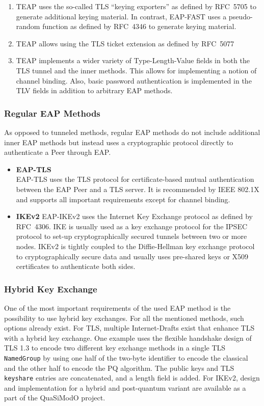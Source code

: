 \begin{itemize}
\begin{enumerate}
    \item TEAP uses the so-called TLS ``keying exporters'' as defined by RFC~5705 to generate additional keying material. In contrast, EAP-FAST uses a pseudo-random function as defined by RFC~4346 to generate keying material.
    \item TEAP allows using the TLS ticket extension as defined by RFC~5077
    \item TEAP implements a wider variety of Type-Length-Value fields in both the TLS tunnel and the inner methods. This allows for implementing a notion of channel binding. Also, basic password authentication is implemented in the TLV fields in addition to arbitrary \ac{EAP} methods. 
  \end{enumerate}
\end{itemize}

\subsubsection{Regular \ac{EAP} Methods}
As opposed to tunneled methods, regular \ac{EAP} methods do not include additional inner \ac{EAP} methods but instead uses a cryptographic protocol directly to authenticate a Peer through EAP.

\begin{itemize}
  \item \textbf{EAP-TLS} \\
  EAP-TLS uses the TLS protocol for certificate-based mutual authentication between the \ac{EAP} Peer and a TLS server. It is recommended by IEEE 802.1X and supports all important requirements except for channel binding.
  \item \textbf{IKEv2}
  EAP-IKEv2 uses the Internet Key Exchange protocol as defined by RFC~4306. IKE is usually used as a key exchange protocol for the IPSEC protocol to set-up cryptographically secured tunnels between two or more nodes. IKEv2 is tightly coupled to the Diffie-Hellman key exchange protocol to cryptographically secure data and usually uses pre-shared keys or X509 certificates to authenticate both sides. 
\end{itemize}

\subsubsection{Hybrid Key Exchange}

One of the most important requirements of the used EAP method is the possibility to use hybrid key exchanges. For all the mentioned methods, such options already exist. For TLS, multiple Internet-Drafts exist that enhance TLS with a hybrid key exchange. One example uses the flexible handshake design of TLS 1.3 to encode two different key exchange methods in a single TLS \texttt{NamedGroup} by using one half of the two-byte identifier to encode the classical and the other half to encode the \ac{PQ} algorithm. The public keys and TLS \texttt{keyshare} entries are concatenated, and a length field is added\cite{ietf-tls-hybrid-design-02}. For IKEv2, design and implementation for a hybrid and post-quantum variant are available as a part of the QuaSiModO project\cite{exchangetowards}.

